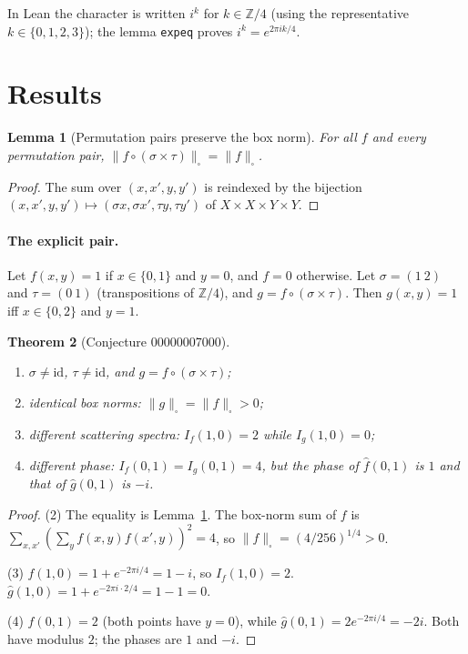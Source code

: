 \documentclass[11pt]{article}
\newtheorem{theorem}{Theorem}
\newtheorem{lemma}[theorem]{Lemma}
\theoremstyle{definition}
\theoremstyle{remark}
\renewcommand{\_}{\oldus\allowbreak}
\begin{document}
In Lean the character is written $i^{k}$ for $k\in\mathbb{Z}/4$ (using the representative
$k\in\{0,1,2,3\}$); the lemma \texttt{exp\_eq} proves $i^{k}=e^{2\pi ik/4}$.

\section{Results}

\begin{lemma}[Permutation pairs preserve the box norm]\label{lem:inv}
For all $f$ and every permutation pair, $\|f\circ(\sigma\times\tau)\|_\square=\|f\|_\square$.
\end{lemma}

\begin{proof}
The sum over $(x,x',y,y')$ is reindexed by the bijection
$(x,x',y,y')\mapsto(\sigma x,\sigma x',\tau y,\tau y')$ of $X\times X\times Y\times Y$.
\end{proof}

\paragraph{The explicit pair.} Let $f(x,y)=1$ if $x\in\{0,1\}$ and $y=0$, and $f=0$ otherwise.
Let $\sigma=(1\ 2)$ and $\tau=(0\ 1)$ (transpositions of $\mathbb{Z}/4$), and $g=f\circ(\sigma\times
\tau)$. Then $g(x,y)=1$ iff $x\in\{0,2\}$ and $y=1$.

\begin{theorem}[Conjecture 00000007000]\label{thm:main}
\begin{enumerate}[nosep]
\item $\sigma\ne\mathrm{id}$, $\tau\ne\mathrm{id}$, and $g=f\circ(\sigma\times\tau)$;
\item identical box norms: $\|g\|_\square=\|f\|_\square>0$;
\item different scattering spectra: $I_f(1,0)=2$ while $I_g(1,0)=0$;
\item different phase: $I_f(0,1)=I_g(0,1)=4$, but the phase of $\hat f(0,1)$ is $1$ and that of
$\hat g(0,1)$ is $-i$.
\end{enumerate}
\end{theorem}

\begin{proof}
(2) The equality is Lemma~\ref{lem:inv}. The box-norm sum of $f$ is
$\sum_{x,x'}(\sum_yf(x,y)f(x',y))^2=4$, so $\|f\|_\square=(4/256)^{1/4}>0$.

(3) $\hat f(1,0)=1+e^{-2\pi i/4}=1-i$, so $I_f(1,0)=2$. $\hat g(1,0)=1+e^{-2\pi i\cdot 2/4}=1-1=0$.

(4) $\hat f(0,1)=2$ (both points have $y=0$), while $\hat g(0,1)=2e^{-2\pi i/4}=-2i$. Both have
modulus $2$; the phases are $1$ and $-i$.
\end{proof}
\end{document}
